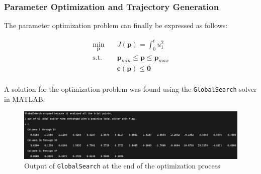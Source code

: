 \documentclass{thesisbeamer}
\newcommand\Fontvi{\fontsize{9}{10}\selectfont}
\begin{document}
\begin{frame}
	\frametitle{Parameter Optimization and Trajectory Generation}
	\Fontvi
		
	The parameter optimization problem can finally be expressed as follows: 

	\begin{equation}\label{parameter_optimization_problem}
		\begin{aligned}
        	\min_{\bm{p}} \quad & J(\bm{p}) = \int_0^t u_1^2 \\
            \textrm{s.t.} \quad & \bm{p}_{min} \leq \bm{p} \leq \bm{p}_{max} \\
            & \bm{c}(\bm{p}) \leq \bm{0} \\
        \end{aligned}
	\end{equation}
	
	A solution for the optimization problem was found using the \texttt{GlobalSearch} solver in MATLAB:
	
	\begin{figure}[h]
	\centering
	\includegraphics[width=\textwidth]{Images/optimization/solution.png}
	\caption{Output of \texttt{GlobalSearch} at the end of the optimization process}
	\label{globalsearch_output}
\end{figure}
	
\end{frame}
		
\end{document}
